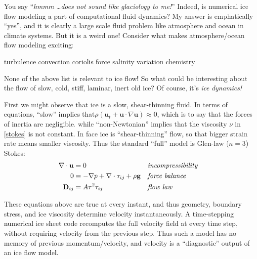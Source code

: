 \documentclass[titlepage,letterpaper,final,12pt]{scrartcl}
\begin{document}
You say ``\emph{hmmm} \dots \emph{does not sound like glaciology to me!}''  Indeed, is numerical ice flow modeling a part of computational fluid dynamics?  My answer is emphatically ``yes'', and it is clearly a large scale fluid problem like atmosphere and ocean in climate systems.  But it is a weird one!  Consider what makes atmosphere/ocean flow modeling exciting:
  \begin{center} turbulence \qquad convection \qquad  coriolis force  \qquad salinity variation \qquad chemistry
  \end{center}
None of the above list is relevant to ice flow!  So what could be interesting about the flow of slow, cold, stiff, laminar, inert old ice?  Of course, it's \emph{ice dynamics!}

First we might observe that ice is a slow, shear-thinning fluid.  In terms of equations, ``slow'' implies that$\rho \left(\mathbf{u}_t + \mathbf{u}\cdot\nabla \mathbf{u}\right) \approx 0$, which is to say that the forces of inertia are negligible.  while ``non-Newtonian'' implies that the viscosity $\nu$ in \eqref{stokes} is not constant.  In face ice is ``shear-thinning'' flow, so that bigger strain rate means smaller viscosity.  Thus the standard ``full'' model is Glen-law ($n=3$) Stokes:
\begin{align}
\nabla \cdot \mathbf{u} &= 0 &&\text{\emph{incompressibility}} \label{incompressibleagain} \\
0 &= - \nabla p + \nabla \cdot \tau_{ij} + \rho \mathbf{g} &&\text{\emph{force balance}} \label{forcebalance} \\
\mathbf{D}_{ij} &= A \tau^2 \tau_{ij} &&\text{\emph{flow law}} \label{flowlaw}
\end{align}

These equations above are true at every instant, and thus geometry, boundary stress, and ice viscosity determine velocity instantaneously.  A time-stepping numerical ice sheet code recomputes the full velocity field at every time step, without requiring velocity from the previous step.  Thus such a model has no memory of previous momentum/velocity, and velocity is a ``diagnostic'' output of an ice flow model.
\end{document}
